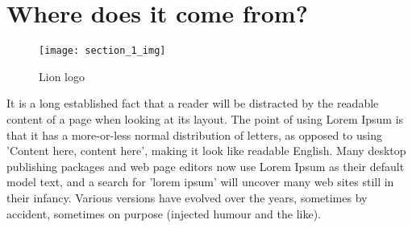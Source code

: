 \documentclass[../templatetop.tex]{subfiles}
\begin{document}
\section{Where does it come from?}

\begin{figure}[h]
    \centering
    \texttt{[image: section\_1\_img]}
    \caption{Lion logo}
    \label{fig:section_1_img}
\end{figure}

It is a long established fact that a reader will be distracted by the readable content of a page when looking at its layout. The point of using Lorem Ipsum is that it has a more-or-less normal distribution of letters, as opposed to using 'Content here, content here', making it look like readable English. Many desktop publishing packages and web page editors now use Lorem Ipsum as their default model text, and a search for 'lorem ipsum' will uncover many web sites still in their infancy. Various versions have evolved over the years, sometimes by accident, sometimes on purpose (injected humour and the like).
\end{document}

